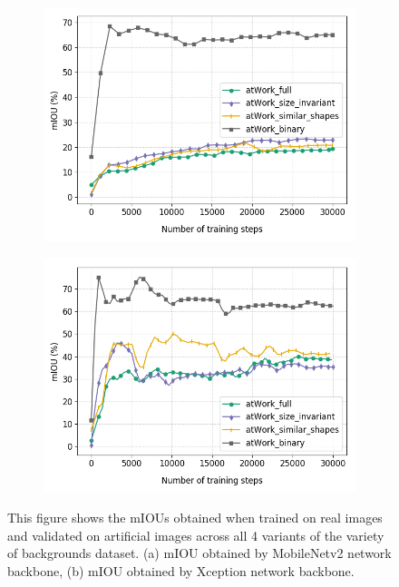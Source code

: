 	\begin{figure}
		\begin{subfigure}{.5\textwidth}
			\centering
			\includegraphics[width=1\linewidth]{images/real_aug_mob}
			\label{realauga}
			\caption{}
		\end{subfigure}
		\begin{subfigure}{.5\textwidth}
			\centering
			\includegraphics[width=1\linewidth]{images/real_aug_xcep}
			\label{realaugb}
			\caption{}
		\end{subfigure}
		\caption{This figure shows the mIOUs obtained when trained on real images and validated on artificial images across all 4 variants of the variety of backgrounds dataset. (a) mIOU obtained by MobileNetv2 network backbone, (b) mIOU obtained by Xception network backbone.}
		\label{Fig:realaug}
	\end{figure}
	
